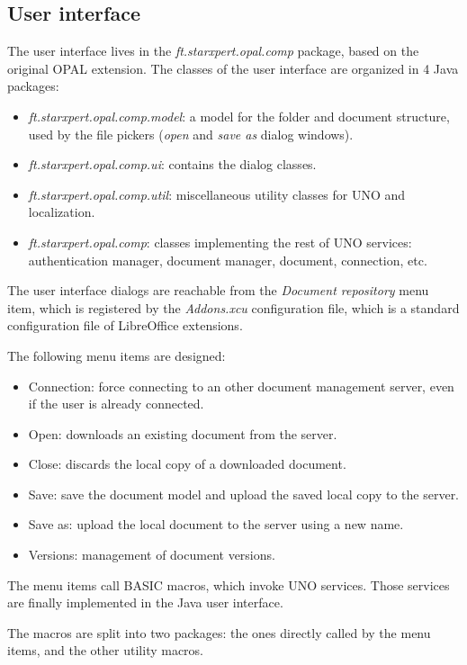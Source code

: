\subsection{User interface}

The user interface lives in the \emph{ft.starxpert.opal.comp} package, based on
the original OPAL extension. The classes of the user interface are organized in
4 Java packages:

\begin{itemize}
\item \emph{ft.starxpert.opal.comp.model}: a model for the folder and document
structure, used by the file pickers (\emph{open} and \emph{save as} dialog
windows).
\item \emph{ft.starxpert.opal.comp.ui}: contains the dialog classes.
\item \emph{ft.starxpert.opal.comp.util}: miscellaneous utility classes for UNO and localization.
\item \emph{ft.starxpert.opal.comp}: classes implementing the rest of UNO
services: authentication manager, document manager, document, connection, etc.
\end{itemize}

The user interface dialogs are reachable from the \emph{Document repository}
menu item, which is registered by the \emph{Addons.xcu} configuration file,
which is a standard configuration file of LibreOffice extensions.

The following menu items are designed:

\begin{itemize}
\item Connection: force connecting to an other document management server, even
if the user is already connected.
\item Open: downloads an existing document from the server.
\item Close: discards the local copy of a downloaded document.
\item Save: save the document model and upload the saved local copy to the server.
\item Save as: upload the local document to the server using a new name.
\item Versions: management of document versions.
\end{itemize}

The menu items call BASIC macros, which invoke UNO services. Those services are
finally implemented in the Java user interface.

The macros are split into two packages: the ones directly called by the menu
items, and the other utility macros.

